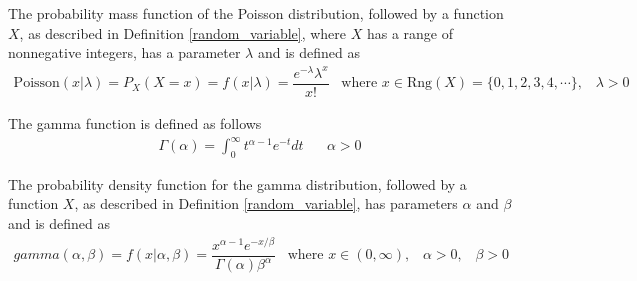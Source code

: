 \begin{definition}
The probability mass function of the Poisson distribution, followed by a function $X$, as described in Definition \ref{random_variable}, where $X$ has a range of nonnegative integers, has a parameter $\lambda$ and is defined as
\begin{align*}
    \text{Poisson}(x | \lambda) = P_{X}(X = x) = f(x | \lambda) =  \dfrac{e^{-\lambda} \lambda^{x}}{x!} \hspace{10pt} \text{where} \hspace{4pt} x \in \text{Rng}(X) = \{0, 1, 2, 3, 4, \cdots\}, \hspace{10pt} \lambda > 0
\end{align*}
\end{definition}

\begin{definition}
The gamma function is defined as follows
\begin{align*}
    \Gamma(\alpha) = \int_{0}^{\infty} t^{\alpha - 1} e^{-t} dt \hspace{20pt} \alpha > 0 
\end{align*}
\end{definition}

\begin{definition}
The probability density function for the gamma distribution, followed by a function $X$, as described in Definition \ref{random_variable}, has parameters $\alpha$ and $\beta$ and is defined as 
\begin{align*}
    gamma(\alpha, \beta) = f(x | \alpha, \beta) = \dfrac{x^{\alpha - 1} e^{-x/\beta}}{\Gamma(\alpha)\beta^{\alpha}} \hspace{10pt} \text{where} \hspace{4pt} x \in (0, \infty), \hspace{10pt} \alpha > 0, \hspace{10pt} \beta > 0
\end{align*}
\end{definition}